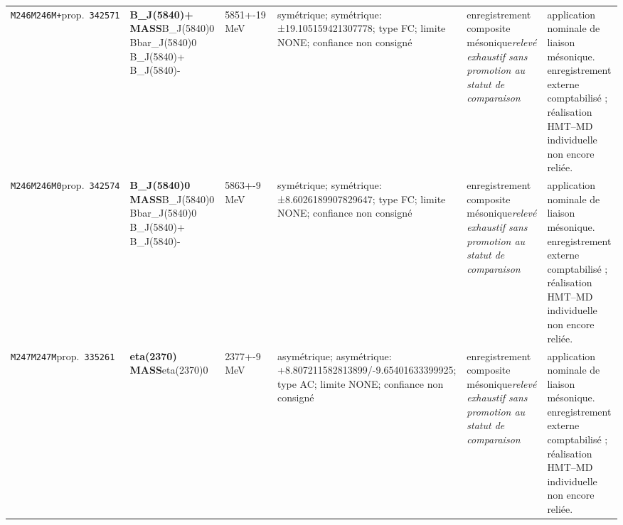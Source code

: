 \begin{landscape}
\begin{longtable}{L{1.85cm}L{4.45cm}L{2.35cm}L{4.05cm}L{3.35cm}L{7.15cm}}
\texttt{M246}\newline \texttt{M246M+}\newline prop.\ \texttt{342571} & \textbf{B\_\allowbreak{}J(5840)+ MASS}\newline B\_\allowbreak{}J(5840)0 \textbar{}\allowbreak{} Bbar\_\allowbreak{}J(5840)0 \textbar{}\allowbreak{} B\_\allowbreak{}J(5840)+ \textbar{}\allowbreak{} B\_\allowbreak{}J(5840)- & 5851+-19\,MeV & symétrique; symétrique: ±19.105159421307778; type FC; limite NONE; confiance non consigné & enregistrement composite mésonique\newline \emph{relevé exhaustif sans promotion au statut de comparaison} & application nominale de liaison mésonique. enregistrement externe comptabilisé ; réalisation HMT--MD individuelle non encore reliée. \\
\texttt{M246}\newline \texttt{M246M0}\newline prop.\ \texttt{342574} & \textbf{B\_\allowbreak{}J(5840)0 MASS}\newline B\_\allowbreak{}J(5840)0 \textbar{}\allowbreak{} Bbar\_\allowbreak{}J(5840)0 \textbar{}\allowbreak{} B\_\allowbreak{}J(5840)+ \textbar{}\allowbreak{} B\_\allowbreak{}J(5840)- & 5863+-9\,MeV & symétrique; symétrique: ±8.6026189907829647; type FC; limite NONE; confiance non consigné & enregistrement composite mésonique\newline \emph{relevé exhaustif sans promotion au statut de comparaison} & application nominale de liaison mésonique. enregistrement externe comptabilisé ; réalisation HMT--MD individuelle non encore reliée. \\
\texttt{M247}\newline \texttt{M247M}\newline prop.\ \texttt{335261} & \textbf{eta(2370) MASS}\newline eta(2370)0 & 2377+-9\,MeV & asymétrique; asymétrique: +8.807211582813899/-9.65401633399925; type AC; limite NONE; confiance non consigné & enregistrement composite mésonique\newline \emph{relevé exhaustif sans promotion au statut de comparaison} & application nominale de liaison mésonique. enregistrement externe comptabilisé ; réalisation HMT--MD individuelle non encore reliée. \\

\end{longtable}
\end{landscape}
